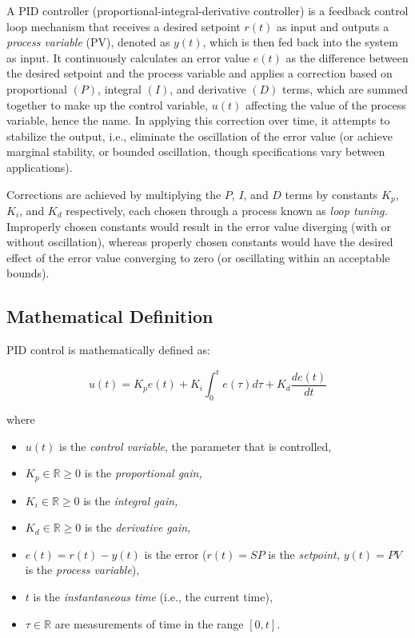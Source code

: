 \documentclass[11pt]{article}
\newcommand{\R}{\mathbb{R}}
\theoremstyle{definition}
\begin{document}
A PID controller (proportional-integral-derivative controller) is a feedback control loop mechanism that receives a desired  setpoint 
$r(t)$ as input and outputs a \textit{process variable} (PV), denoted as $y(t)$, which is then fed back into the system
as input. It continuously calculates an  error value $e(t)$ as the difference between the desired setpoint and the process variable
and applies a correction based on  proportional $(P)$, integral $(I)$, and derivative $(D)$ terms, which are summed
together to make up the  control variable, $u(t)$ affecting the value of the process variable, hence the name.  
In applying this correction over time, it attempts to stabilize the output, i.e., eliminate the oscillation of the error value
(or achieve marginal stability, or bounded oscillation, though specifications vary between applications).

Corrections are achieved by multiplying the $P$, $I$, and $D$ terms by constants $K_{p}$, $K_{i}$, and $K_{d}$ respectively, each chosen through
a process known as \textit{loop tuning.} Improperly chosen constants would result in the error value diverging (with or without oscillation),
whereas properly chosen constants would have the desired effect of the error value converging to zero (or oscillating within 
an acceptable bounds).

\newpage

\subsection{Mathematical Definition}

PID control is mathematically defined as:

\begin{equation} \label{eq1}
    \boxed{
        u(t) = K_{p}e(t) + K_{i}\int_{0}^{t}e(\tau)d\tau + K_{d}\frac{de(t)}{dt}
    }
\end{equation}

where

\begin{itemize}
    \item $u(t)$ is the \textit{control variable}, the parameter that is controlled,
    \item $K_{p} \in \R \geq 0$ is the \textit{proportional gain,}
    \item $K_{i} \in \R \geq 0$ is the \textit{integral gain,}
    \item $K_{d} \in \R \geq 0$ is the \textit{derivative gain,}
    \item $e(t) = r(t) - y(t)$ is the error ($r(t) = SP$ is the \textit{setpoint,} $y(t) = PV$ is the \textit{process variable}),
    \item $t$ is the \textit{instantaneous time} (i.e., the current time),
    \item $\tau \in \R$ are measurements of time in the range $[0, t]$.
\end{itemize}
\end{document}

